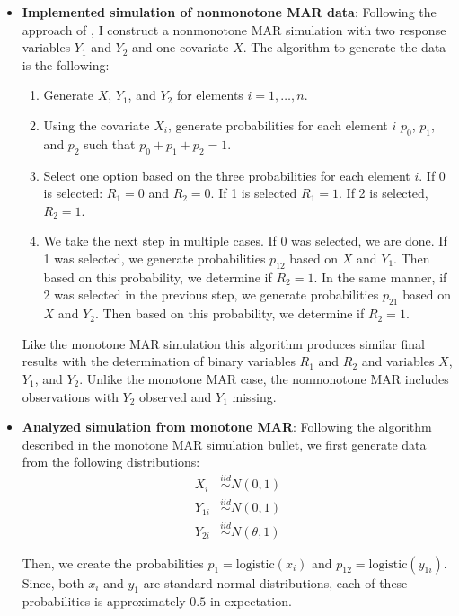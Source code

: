 \documentclass[12pt]{article}
\newcommand{\logistic}{{\text{logistic}}}
\begin{document}
\begin{itemize}
  \item \textbf{Implemented simulation of nonmonotone MAR data}: 
  Following the approach
    of \cite{robins1997non}, I construct a nonmonotone MAR simulation with two 
    response variables $Y_1$ and $Y_2$ and one covariate $X$. The algorithm to
    generate the data is the following:
    \begin{enumerate}
        \item Generate $X$, $Y_1$, and $Y_2$ for elements $i = 1, \dots, n$.
        \item Using the covariate $X_i$, generate probabilities for each element
          $i$ $p_0$, $p_1$, and $p_2$ such that $p_0 + p_1 + p_2 = 1$. 
        \item Select one option based on the three probabilities for each
          element $i$. If 0 is selected: $R_1 = 0$ and $R_2 = 0$. If 1 is
          selected $R_1 = 1$. If 2 is selected, $R_2 = 1$.
        \item We take the next step in multiple cases. If 0 was selected, we are
          done. If 1 was selected, we generate probabilities $p_{12}$ based on
          $X$ and $Y_1$. Then based on this probability, we determine if $R_2 =
          1$. In the same manner, if 2 was selected in the previous step, we
          generate probabilities $p_{21}$ based on $X$ and $Y_2$. Then based on
          this probability, we determine if $R_2 = 1$.
    \end{enumerate}
    Like the monotone MAR simulation this algorithm produces similar final
    results with the determination of binary variables $R_1$ and $R_2$ and
    variables $X$, $Y_1$, and $Y_2$. Unlike the monotone MAR case, the
    nonmonotone MAR includes observations with $Y_2$ observed and $Y_1$ missing.
    
    \item \textbf{Analyzed simulation from monotone MAR}:
    Following the algorithm described in the monotone MAR simulation bullet, 
    we first generate data from the following distributions:
    \begin{align*}
        X_i &\stackrel{iid}{\sim} N(0, 1) \\
        Y_{1i} &\stackrel{iid}{\sim} N(0, 1)\\
        Y_{2i} &\stackrel{iid}{\sim} N(\theta, 1)
    \end{align*}

    Then, we create the probabilities $p_1 = \logistic(x_i)$ and 
    $p_{12} = \logistic(y_{1i})$.
    Since, both $x_i$ and $y_1$ are standard normal distributions, each of these
    probabilities is approximately $0.5$ in expectation.


\end{itemize}
\end{document}
